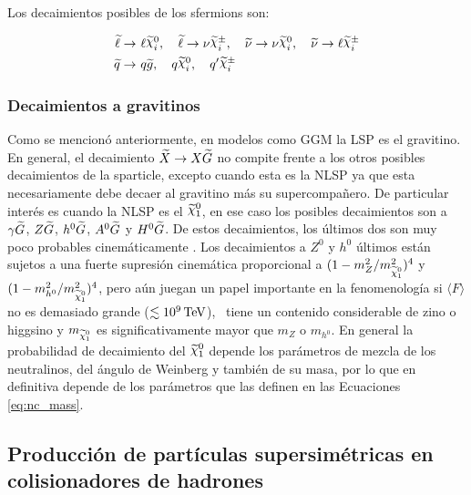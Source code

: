Los decaimientos posibles de los sfermions son:

\begin{equation}
	\begin{split}
		\slepton \to &\ \ell\ggino^0_i,\quad \slepton \to \nu\ggino^\pm_i,\quad \snu\to \nu\ggino^0_i,\quad \snu\to \ell\ggino^\pm_i \\
		\squark\to &\ q\gluino,\quad q\ggino^0_i,\quad q'\ggino^\pm_i
	\end{split}
\end{equation}

\subsubsection{Decaimientos a gravitinos}

Como se mencionó anteriormente, en modelos como GGM la LSP es el gravitino. En general, el decaimiento $\widetilde{X} \to X\widetilde{G}$ no compite frente a los otros posibles decaimientos de la sparticle, excepto cuando esta es la NLSP ya que esta necesariamente debe decaer al gravitino más su supercompañero. De particular interés es cuando la NLSP es el $\ninoone$, en ese caso los posibles decaimientos son a $\gamma\widetilde{G}$, $Z\widetilde{G}$, $h^0\widetilde{G}$, $A^0\widetilde{G}$ y $H^0\widetilde{G}$. De estos decaimientos, los últimos dos son muy poco probables cinemáticamente
. Los decaimientos a $Z^0$ y $h^0$ últimos están sujetos a una fuerte supresión cinemática proporcional a $ (1-m_{Z}^{2}/m_{\ninoone}^{2})^4$ y $(1-m_{h^{0}}^{2}/m_{\ninoone}^{2})^4$, pero aún juegan un papel importante en la fenomenología si $ \langle F \rangle $ no es demasiado grande ($\lesssim 10^9\,\text{TeV}$), \ninoone\ tiene un contenido considerable de zino o higgsino y $m_{\ninoone}$ es significativamente mayor que $m_{Z}$ o $m_{h^{0}}$. 
En general la probabilidad de decaimiento del $\ninoone$ depende los parámetros de mezcla de los neutralinos, del ángulo de Weinberg y también de su masa, por lo que en definitiva depende de los parámetros que las definen en las Ecuaciones \ref{eq:nc_mass}.

\subsection{Producción de partículas supersimétricas en colisionadores de hadrones}

